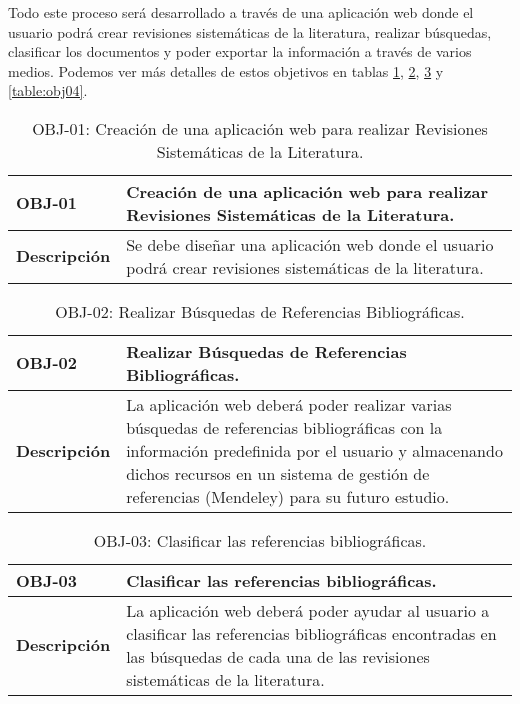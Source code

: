 Todo este proceso será desarrollado a través de una aplicación web donde el usuario podrá crear revisiones sistemáticas de la literatura, realizar búsquedas, clasificar los documentos y poder exportar la información a través de varios medios. Podemos ver más detalles de estos objetivos en tablas \ref{table:obj01}, \ref{table:obj02}, \ref{table:obj03} y \ref{table:obj04}.

\begin{table}[!hbt]
	\begin{center}
		\begin{tabular}{|p{3cm}|p{12cm}|}
			\hline
			\textbf{OBJ-01} & Creación de una aplicación web para realizar Revisiones Sistemáticas de la Literatura.\\
			\hline
			\textbf{Descripción} & Se debe diseñar una aplicación web donde el usuario podrá crear revisiones sistemáticas de la literatura.\\
			\hline
		\end{tabular}
		\caption{OBJ-01: Creación de una aplicación web para realizar Revisiones Sistemáticas de la Literatura.}
		\label{table:obj01}
	\end{center}
\end{table}

\begin{table}[!hbt]
	\begin{center}
		\begin{tabular}{|p{3cm}|p{12cm}|}
			\hline
			\textbf{OBJ-02} & Realizar Búsquedas de Referencias Bibliográficas.\\
			\hline
			\textbf{Descripción} & La aplicación web deberá poder realizar varias búsquedas de referencias bibliográficas con la información predefinida por el usuario y almacenando dichos recursos en un sistema de gestión de referencias (Mendeley) para su futuro estudio.\\
			\hline
		\end{tabular}
		\caption{OBJ-02: Realizar Búsquedas de Referencias Bibliográficas.}
		\label{table:obj02}
	\end{center}
\end{table}

\begin{table}[!hbt]
	\begin{center}
		\begin{tabular}{|p{3cm}|p{12cm}|}
			\hline
			\textbf{OBJ-03} & Clasificar las referencias bibliográficas.\\
			\hline
			\textbf{Descripción} & La aplicación web deberá poder ayudar al usuario a clasificar las referencias bibliográficas encontradas en las búsquedas de cada una de las revisiones sistemáticas de la literatura.\\
			\hline
		\end{tabular}
		\caption{OBJ-03: Clasificar las referencias bibliográficas.}
		\label{table:obj03}
	\end{center}
\end{table}

